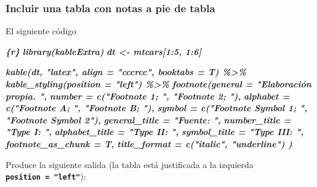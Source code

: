 \documentclass[12pt,a4paper,oneside,]{article}
\newenvironment{Shaded}{\begin{snugshade}}{\end{snugshade}}
\newcommand{\InformationTok}[1]{\textcolor[rgb]{0.56,0.35,0.01}{\textbf{\textit{#1}}}}
\numberwithin{dummy}{section}
\theoremstyle{ocrenumbox}
\theoremstyle{blacknumex}
\theoremstyle{blacknumbox}
\theoremstyle{ocrenum}
\theoremstyle{ocrenum}
\begin{document}
\hypertarget{incluir-una-tabla-con-notas-a-pie-de-tabla}{%
\subsubsection{Incluir una tabla con notas a pie de
tabla}\label{incluir-una-tabla-con-notas-a-pie-de-tabla}}

El siguiente código

\begin{Shaded}
\begin{Highlighting}[]
\InformationTok{\textasciigrave{}\textasciigrave{}\textasciigrave{}\{r\}}
\InformationTok{library(kableExtra)}
\InformationTok{dt \textless{}{-} mtcars[1:5, 1:6]}

\InformationTok{kable(dt, "latex", align = "cccrcc", booktabs = T) \%\textgreater{}\%}
\InformationTok{    kable\_styling(position = "left") \%\textgreater{}\% }
\InformationTok{    footnote(general = "Elaboración propia. ",}
\InformationTok{             number = c("Footnote 1; ", "Footnote 2; "),}
\InformationTok{             alphabet = c("Footnote A; ", "Footnote B; "),}
\InformationTok{             symbol = c("Footnote Symbol 1; ", "Footnote Symbol 2"), }
\InformationTok{             general\_title = "Fuente: ", }
\InformationTok{             number\_title = "Type I: ", }
\InformationTok{             alphabet\_title = "Type II: ", }
\InformationTok{             symbol\_title = "Type III: ", }
\InformationTok{             footnote\_as\_chunk = T, }
\InformationTok{             title\_format = c("italic", "underline") )}
\InformationTok{\textasciigrave{}\textasciigrave{}\textasciigrave{}}
\end{Highlighting}
\end{Shaded}

Produce la siguiente salida (la tabla está justificada a la izquierda
\textbf{\texttt{position\ =\ "left"}}):
\end{document}
